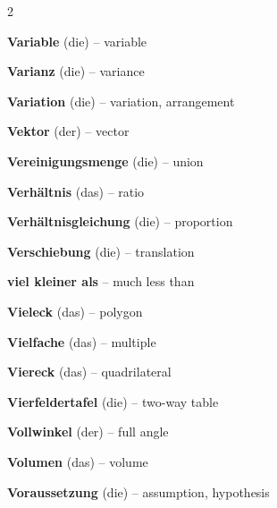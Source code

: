\begin{multicols}{2}
\par\nopagebreak
\textbf{Variable} (die) -- variable\dotfill\hyperref[e:71]{\pageref*{e:71}}\par
\textbf{Varianz} (die) -- variance\dotfill\hyperref[e:336]{\pageref*{e:336}}\par
\textbf{Variation} (die) -- variation, arrangement\dotfill\hyperref[e:342]{\pageref*{e:342}}\par
\textbf{Vektor} (der) -- vector\dotfill\hyperref[e:301]{\pageref*{e:301}}\par
\textbf{Vereinigungsmenge} (die) -- union\dotfill\hyperref[e:101]{\pageref*{e:101}}\par
\textbf{Verhältnis} (das) -- ratio\dotfill\hyperref[e:40]{\pageref*{e:40}}\par
\textbf{Verhältnisgleichung} (die) -- proportion\dotfill\hyperref[e:41]{\pageref*{e:41}}\par
\textbf{Verschiebung} (die) -- translation\dotfill\hyperref[e:173]{\pageref*{e:173}}\par
\textbf{viel kleiner als} -- much less than\dotfill\hyperref[e:67]{\pageref*{e:67}}\par
\textbf{Vieleck} (das) -- polygon\dotfill\hyperref[e:204]{\pageref*{e:204}}\par
\textbf{Vielfache} (das) -- multiple\dotfill\hyperref[e:55]{\pageref*{e:55}}\par
\textbf{Viereck} (das) -- quadrilateral\dotfill\hyperref[e:196]{\pageref*{e:196}}\par
\textbf{Vierfeldertafel} (die) -- two-way table\dotfill\hyperref[e:333]{\pageref*{e:333}}\par
\textbf{Vollwinkel} (der) -- full angle\dotfill\hyperref[e:162]{\pageref*{e:162}}\par
\textbf{Volumen} (das) -- volume\dotfill\hyperref[e:255]{\pageref*{e:255}}\par
\textbf{Voraussetzung} (die) -- assumption, hypothesis\dotfill\hyperref[e:348]{\pageref*{e:348}}\par


\end{multicols}
